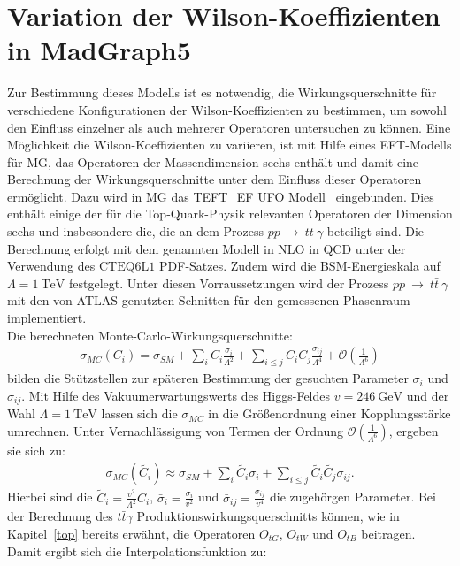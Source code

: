 \section{Variation der Wilson-Koeffizienten in MadGraph5}%
%
Zur Bestimmung dieses Modells ist es notwendig, die Wirkungsquerschnitte für verschiedene Konfigurationen der Wilson-Koeffizienten zu bestimmen, um sowohl den Einfluss einzelner als auch mehrerer Operatoren untersuchen zu können.
Eine Möglichkeit die Wilson-Koeffizienten zu variieren, ist mit Hilfe eines  EFT-Modells für MG, das Operatoren der Massendimension sechs enthält und damit eine Berechnung der Wirkungsquerschnitte unter dem Einfluss dieser Operatoren ermöglicht. Dazu wird in MG das TEFT\_EF UFO Modell~\cite{EFTModell} eingebunden.
Dies enthält einige der für die Top-Quark-Physik relevanten Operatoren der Dimension sechs und insbesondere die, die an dem Prozess $pp~\rightarrow~t\bar{t}~\gamma$ beteiligt sind.
Die Berechnung erfolgt mit dem genannten Modell in NLO in QCD unter der Verwendung des $\text{CTEQ}6\text{L}1$ PDF-Satzes.
Zudem wird die BSM-Energieskala auf $\Lambda = \SI{1}{\tera\electronvolt}$ festgelegt.
Unter diesen Vorraussetzungen wird der Prozess $pp~\rightarrow~t\bar{t}~\gamma$ mit den von ATLAS genutzten Schnitten für den gemessenen Phasenraum implementiert.\\
Die berechneten Monte-Carlo-Wirkungsquerschnitte:
\begin{align}
  \sigma_{MC}({C_i}) = \sigma_{SM} + \sum_{i} C_i \frac{\sigma_i}{\Lambda^2} + \sum_{i \leq j} C_i C_j \frac{\sigma_{ij}}{\Lambda^4} + \mathcal{O}\left(\frac{1}{\Lambda^6}\right)
\end{align}
bilden die Stützstellen zur späteren Bestimmung der gesuchten Parameter $\sigma_i$ und $\sigma_{ij}$.
Mit Hilfe des Vakuumerwartungswerts des Higgs-Feldes $v = \SI{246}{\giga\electronvolt}$ und der Wahl $\Lambda = \SI{1}{\tera\electronvolt}$ lassen sich die $\sigma_{MC}$ in die Größenordnung einer Kopplungsstärke umrechnen.
Unter Vernachlässigung von Termen der Ordnung $\mathcal{O}(\frac{1}{\Lambda^6})$, ergeben sie sich zu:
\begin{align}
  \sigma_{MC}({\tilde{C_i}}) \approx \sigma_{SM} + \sum_{i} \tilde{C_i} \bar{\sigma_i} + \sum_{i \leq j} \tilde{C_i} \tilde{C_j} \bar{\sigma}_{ij}.
\end{align}
Hierbei sind die $\tilde{C}_i = \frac{v^2}{\Lambda^2} C_i$, $\bar{\sigma}_i = \frac{\sigma_i}{v^2}$ und $\bar{\sigma}_{ij} = \frac{\sigma_{ij}}{v^4}$ die zugehörgen Parameter.
Bei der Berechnung des $t\bar{t}\gamma$ Produktionswirkungsquerschnitts können, wie in Kapitel~\ref{top} bereits erwähnt, die Operatoren $O_{tG}$, $O_{tW}$ und $O_{tB}$ beitragen. Damit ergibt sich die Interpolationsfunktion zu:

